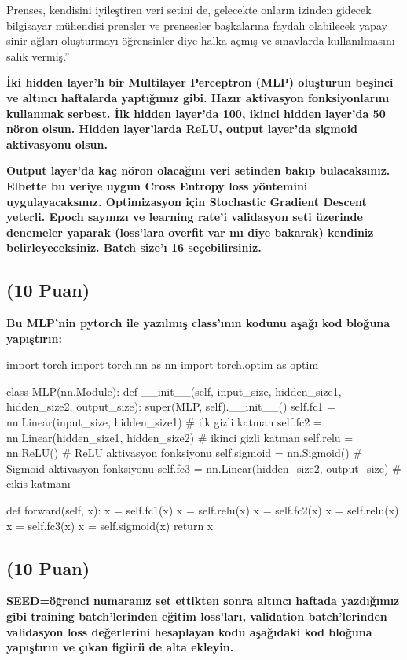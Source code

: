 \documentclass[11pt]{article}
\begin{document}
Prenses, kendisini iyileştiren veri setini de, gelecekte onların izinden gidecek bilgisayar mühendisi prensler ve prensesler başkalarına faydalı olabilecek yapay sinir ağları oluşturmayı öğrensinler diye halka açmış ve sınavlarda kullanılmasını salık vermiş.''

\textbf{İki hidden layer'lı bir Multilayer Perceptron (MLP) oluşturun beşinci ve altıncı haftalarda yaptığımız gibi. Hazır aktivasyon fonksiyonlarını kullanmak serbest. İlk hidden layer'da 100, ikinci hidden layer'da 50 nöron olsun. Hidden layer'larda ReLU, output layer'da sigmoid aktivasyonu olsun.}

\textbf{Output layer'da kaç nöron olacağını veri setinden bakıp bulacaksınız. Elbette bu veriye uygun Cross Entropy loss yöntemini uygulayacaksınız. Optimizasyon için Stochastic Gradient Descent yeterli. Epoch sayınızı ve learning rate'i validasyon seti üzerinde denemeler yaparak (loss'lara overfit var mı diye bakarak) kendiniz belirleyeceksiniz. Batch size'ı 16 seçebilirsiniz.}

\subsection{(10 Puan)} \textbf{Bu MLP'nin pytorch ile yazılmış class'ının kodunu aşağı kod bloğuna yapıştırın:}

\begin{python}
import torch
import torch.nn as nn
import torch.optim as optim

class MLP(nn.Module):
    def __init__(self, input_size, hidden_size1, hidden_size2, output_size):
        super(MLP, self).__init__()
        self.fc1 = nn.Linear(input_size, hidden_size1)  # ilk gizli katman
        self.fc2 = nn.Linear(hidden_size1, hidden_size2)  # ikinci gizli katman
        self.relu = nn.ReLU()  # ReLU aktivasyon fonksiyonu
        self.sigmoid = nn.Sigmoid()  # Sigmoid aktivasyon fonksiyonu
        self.fc3 = nn.Linear(hidden_size2, output_size)  # cikis katmanı
        
    def forward(self, x):
        x = self.fc1(x)
        x = self.relu(x)
        x = self.fc2(x)
        x = self.relu(x)
        x = self.fc3(x)
        x = self.sigmoid(x)
        return x
\end{python}

\subsection{(10 Puan)} \textbf{SEED=öğrenci numaranız set ettikten sonra altıncı haftada yazdığımız gibi training batch'lerinden eğitim loss'ları, validation batch'lerinden validasyon loss değerlerini hesaplayan kodu aşağıdaki kod bloğuna yapıştırın ve çıkan figürü de alta ekleyin.}
\end{document}
